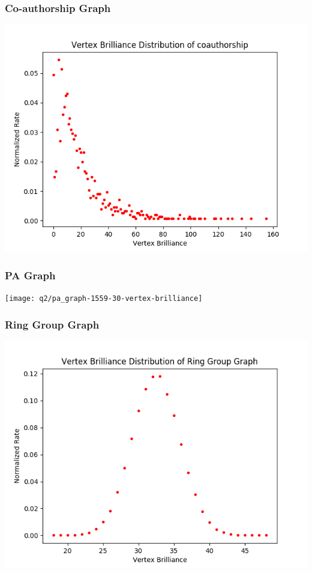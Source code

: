 \documentclass[11pt,a4paper,notitlepage]{article}
\begin{document}
\subsubsection*{Co-authorship Graph}
\includegraphics{q2/coauthorship-vertex-brilliance}

\subsubsection*{PA Graph}
\texttt{[image: q2/pa\_graph-1559-30-vertex-brilliance]}
\subsubsection*{Ring Group Graph}
\includegraphics{q2/ring_group_graph-60-26-0.22-0.03-brilliance}
\end{document}
